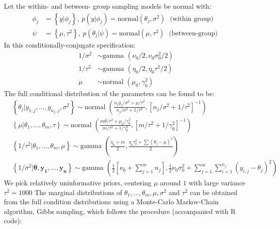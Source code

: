 \documentclass[]{article}
\begin{document}
\begin{enumerate}
        Let the within- and between- group sampling models be normal with:
        \begin{align*}
            \phi_j &= \left\{ y | \phi_j \right\}, \ p(y|\phi_j) = \text{normal}(\theta_j, \sigma^2) \text{~ (within group) } \\
            \psi &= \left\{ \mu, \tau^2 \right\}, \ p(\theta_j|\psi) = \text{normal}(\mu, \tau^2) \text{~ (between-group) }
        \end{align*}
        In this conditionally-conjugate specification:
        \begin{align*}
            1/\sigma^2 & \sim \text{gamma }(\nu_0/2, \nu_0\sigma^2_0/2)\\
            1/\tau^2 & \sim \text{gamma }(\eta_0/2,\eta_0\tau^2/2)\\
            \mu & \sim \text{normal }(\mu_0, \gamma_0^2)
        \end{align*}
        The full conditional distribution of the parameters can be found to be:
        \begin{align*}
            & \left\{ \theta_j | y_{1,j},\ldots,y_{n_j,j},\sigma^2 \right\} \sim \text{normal }\left( \frac{n_j\bar{y}_j/\sigma^2+\mu/\tau^2}{n_j/\sigma^2 + 1/\tau^2}, \left[ n_j/\sigma^2+1/\tau^2\right]^{-1} \right) \\
            & \left\{\mu | \theta_1,\ldots,\theta_m,\tau \right\} \sim \text{normal } \left( \frac{m\bar{\theta}/\tau^2 + \mu_0/\gamma_0^2}{m/\tau^2+1/\gamma_0^2},\left[ m/\tau^2 + 1/\gamma_0^2\right]^{-1} \right)\\
            & \left\{ 1/\tau^2 | \theta_1, \ldots, \theta_m, \mu \right\} \sim \text{gamma }\left( \frac{\eta_0 +m}{2},\frac{\eta_o\tau^2_0+\sum\left(\theta_j -\mu \right)^2}{2} \right) \\
            & \left\{1/\sigma^2 | \boldsymbol{\theta}, \boldsymbol{y_1}, \ldots, \boldsymbol{y_n} \right\} \sim \text{gamma }\left( \frac{1}{2}\left[ \nu_0 + \sum\limits_{j=1}^m n_j \right], \frac{1}{2}\nu_0\sigma_0^2 + \sum\limits_{j=1}^m \sum\limits_{i=1}^{n_j} \left(y_{i,j} -\theta_j \right)^2 \right)
        \end{align*}
        We pick relatively uninformative priors, centering $\mu$ around $1$ with large variance $\tau^2 = 1000$
        The marginal distributions of $\theta_1, \ldots, \theta_m, \mu, \sigma^2$ and $\tau^2$ can be obtained from the full condition distributions using a Monte-Carlo Markov-Chain algorithm, Gibbs sampling, which follows the procedure (accompanied with R code):
  

\end{enumerate}
\end{document}
